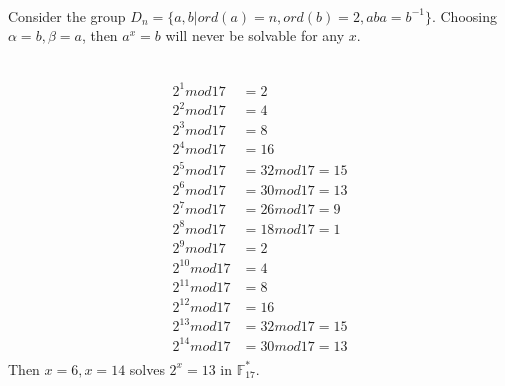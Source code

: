 \documentclass{assignment}
\begin{document}
\begin{problemlist}
\pbitem
\begin{problem}
\end{problem}
\begin{answer}
  \\
  Consider the group $D_n=\{a,b|ord(a)=n,ord(b)=2,aba=b^{-1}\}$. Choosing $\alpha = b, \beta = a$, then $a^x = b$ will never be solvable for any $x$.
\end{answer}

\pbitem
\begin{problem}
\end{problem}
\begin{answer}
  \\
  \begin{align*}
    2^1 mod 17 &= 2\\
    2^2 mod 17 &= 4\\
    2^3 mod 17 &= 8\\
    2^4 mod 17 &= 16\\
    2^5 mod 17 &= 32 mod 17 = 15\\
    2^6 mod 17 &= 30 mod 17 = 13\\
    2^7 mod 17 &= 26 mod 17 = 9\\
    2^8 mod 17 &= 18 mod 17 = 1\\
    2^9 mod 17 &= 2 \\
    2^{10} mod 17 &= 4\\
    2^{11} mod 17 &= 8\\
    2^{12} mod 17 &= 16\\
    2^{13} mod 17 &= 32 mod 17 = 15\\
    2^{14} mod 17 &= 30 mod 17 = 13\\
  \end{align*}
  Then $x=6,x=14$ solves $2^x=13$ in $\mathbb{F}_{17}^*$.
\end{answer}


\end{problemlist}
\end{document}
